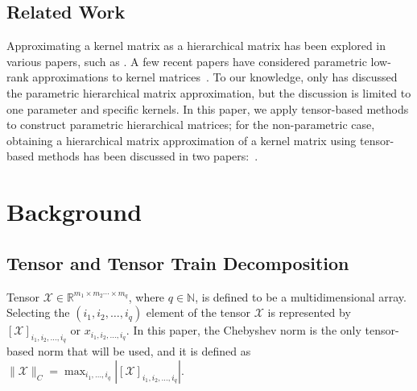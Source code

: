 \documentclass[final,3p,times]{elsarticle}
\newcommand{\R}{\mathbb{R}}
\newcommand{\ten}[1]{\boldsymbol{\mathcal{#1}}}
\begin{document}
\subsection{Related Work} 
 Approximating a kernel matrix as a hierarchical matrix has been explored in various papers, such as \cite{hackbusch2004hierarchical, cai2024data, MR2854612, iske2017hierarchical, wang2021pbbfmm3d, li2025hierarchical}. A few recent papers have considered parametric low-rank approximations to kernel matrices~\cite{shustin2022gauss,kressner2020certified,kressner2024randomized,park2025low, greengard2025efficient}.
To our knowledge, only \cite{gopal2022broadband} has discussed the parametric hierarchical matrix approximation, but the discussion is limited to one parameter and  specific kernels.  In this paper, we apply tensor-based methods  to construct parametric hierarchical matrices; for the non-parametric case, obtaining a hierarchical matrix approximation of a kernel matrix using tensor-based methods has been discussed in two papers:~\cite{corona2017tensor, li2025hierarchical}.




\section{Background}

\label{sec:background}

\subsection{Tensor and Tensor Train Decomposition}\label{ssec:background_tensors}
Tensor $\ten{X} \in \R^{m_1 \times m_2 \cdots \times m_q}$, where $q \in \mathbb{N}$, is defined to be a multidimensional array. Selecting the $(i_1, i_2, \dots , i_q)$ element of the tensor $\ten{X}$ is represented by $[\ten{X}]_{i_1, i_2, \dots, i_q}$ or $x_{i_1, i_2, \dots, i_q}$. In this paper, the Chebyshev norm is the only tensor-based norm that will be used, and it is defined as $\|\ten{X}\|_C = \max_{i_1,\dots,i_q}|[\ten{X}]_{i_1, i_2, \dots, i_q}|.$ 
\end{document}
